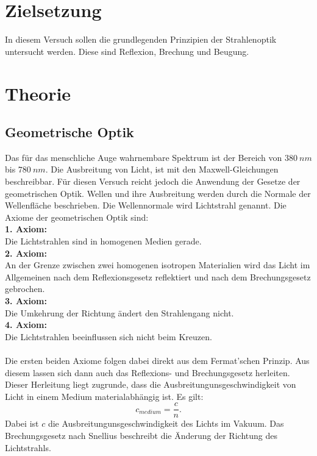 \section{Zielsetzung}
\label{sec:Zielsetzung}
In diesem Versuch sollen die grundlegenden Prinzipien der Strahlenoptik untersucht werden. Diese sind Reflexion, Brechung und Beugung.

\section{Theorie}
\label{sec:Theorie}
\subsection{Geometrische Optik}
Das für das menschliche Auge wahrnembare Spektrum ist der Bereich von $\SI{380}{nm}$ bis $\SI{780}{nm}$. Die Ausbreitung von Licht, ist mit den Maxwell-Gleichungen
beschreibbar. Für diesen Versuch reicht jedoch die Anwendung der Gesetze der geometrischen Optik. Wellen und ihre Ausbreitung werden durch die Normale der Wellenfläche beschrieben.
Die Wellennormale wird Lichtstrahl genannt. Die Axiome der geometrischen Optik sind:\\
\textbf{1. Axiom:}\\
Die Lichtstrahlen sind in homogenen Medien gerade.\\
\textbf{2. Axiom:}\\
An der Grenze zwischen zwei homogenen isotropen Materialien wird das Licht im Allgemeinen nach dem Reflexionsgesetz reflektiert und nach dem Brechungsgesetz gebrochen.\\
\textbf{3. Axiom:}\\
Die Umkehrung der Richtung ändert den Strahlengang nicht.\\
\textbf{4. Axiom:}\\
Die Lichtstrahlen beeinflussen sich nicht beim Kreuzen.\\
\\
Die ersten beiden Axiome folgen dabei direkt aus dem Fermat'schen Prinzip. Aus diesem lassen sich dann auch das Reflexions- und Brechungsgesetz herleiten.\\
Dieser Herleitung liegt zugrunde, dass die Ausbreitungunsgeschwindigkeit von Licht in einem Medium materialabhängig ist. Es gilt:
\begin{equation}\label{eq:c_medium}
    c_{medium} = \frac{c}{n}.
\end{equation}
Dabei ist $c$ die Ausbreitungunsgeschwindigkeit des Lichts im Vakuum. Das Brechungsgesetz nach Snellius beschreibt die Änderung der Richtung des Lichtstrahls.
